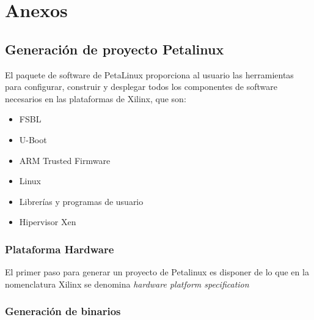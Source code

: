 \chapter{Anexos}

\section{Generación de proyecto Petalinux} \label{petalinux}

El paquete de software de PetaLinux proporciona al usuario las herramientas para configurar, construir y desplegar todos los componentes de software necesarios en las plataformas de Xilinx, que son:
\begin{itemize}
  \item \acrshort{FSBL}
  \item U-Boot
  \item ARM Trusted Firmware
  \item Linux
  \item Librerías y programas de usuario
  \item Hipervisor Xen
\end{itemize}


\subsection{Plataforma Hardware}
El primer paso para generar un proyecto de Petalinux es disponer de lo que en la nomenclatura Xilinx se denomina \textit{hardware platform specification}

\subsection{Generación de binarios}
